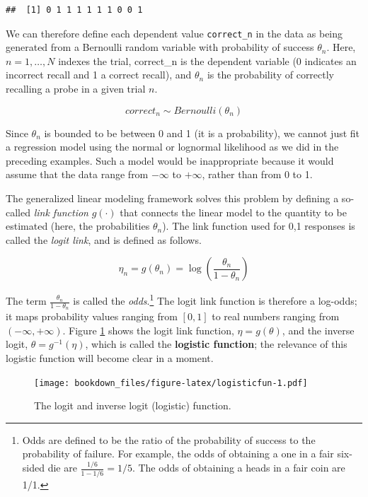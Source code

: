\documentclass[12pt,]{krantz}
\theoremstyle{definition}
\theoremstyle{definition}
\theoremstyle{definition}
\theoremstyle{remark}
\begin{document}
\begin{verbatim}
##  [1] 0 1 1 1 1 1 1 0 0 1
\end{verbatim}

We can therefore define each dependent value \texttt{correct\_n} in the data as being generated from a Bernoulli random variable with probability of success \(\theta_n\).
Here, \(n =1, \ldots, N\) indexes the trial, correct\_n is the dependent variable (0 indicates an incorrect recall and 1 a correct recall), and \(\theta_n\) is the probability of correctly recalling a probe in a given trial \(n\).

\begin{equation}
correct_n \sim Bernoulli(\theta_n)
\label{eq:bernoullilik}
\end{equation}

Since \(\theta_n\) is bounded to be between 0 and 1 (it is a probability), we cannot just fit a regression model using the normal or lognormal likelihood as we did in the preceding examples. Such a model would be inappropriate because it would assume that the data range from \(-\infty\) to \(+\infty\), rather than from 0 to 1.

The generalized linear modeling framework solves this problem by defining a so-called \emph{link function} \(g(\cdot)\) that connects the linear model to the quantity to be estimated (here, the probabilities \(\theta_n\)). The link function used for 0,1 responses is called the \emph{logit link}, and is defined as follows.

\begin{equation}
\eta_n = g(\theta_n) = \log\left(\frac{\theta_n}{1-\theta_n}\right)
\end{equation}

The term \(\frac{\theta_n}{1-\theta_n}\) is called the \emph{odds}.\footnote{Odds are defined to be the ratio of the probability of success to the probability of failure. For example, the odds of obtaining a one in a fair six-sided die are \(\frac{1/6}{1-1/6}=1/5\). The odds of obtaining a heads in a fair coin are 1/1.} The logit link function is therefore a log-odds; it maps probability values ranging from \([0,1]\) to real numbers ranging from \((-\infty,+\infty)\). Figure \ref{fig:logisticfun} shows the logit link function, \(\eta = g(\theta)\), and the inverse logit, \(\theta = g^{-1}(\eta)\), which is called the \textbf{logistic function}; the relevance of this logistic function will become clear in a moment.

\begin{figure}
\centering
\texttt{[image: bookdown\_files/figure-latex/logisticfun-1.pdf]}
\caption{\label{fig:logisticfun}The logit and inverse logit (logistic) function.}
\end{figure}
\end{document}
